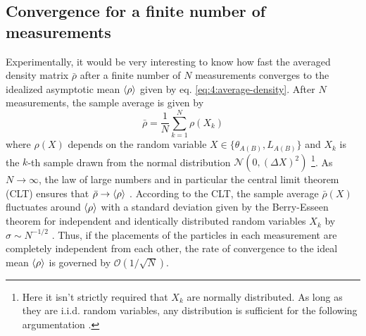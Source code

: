\subsection*{Convergence for a finite number of measurements}
Experimentally, it would be very interesting to know how fast the averaged density matrix $\bar{\rho}$ after a finite number of $N$ measurements converges to the idealized asymptotic mean $\left\langle\rho\right\rangle$ given by eq. \eqref{eq:4:average-density}.
After $N$ measurements, the sample average is given by
\begin{equation}
  \bar{\rho} = \frac{1}{N} \sum_{k=1}^{N} \rho(X_k)
\end{equation}
where $\rho(X)$ depends on the random variable $X \in \{\theta_{A(B)}, L_{A(B)}\}$ and $X_k$ is the $k$-th sample drawn from the normal distribution $\mathcal{N}(0, (\Delta X)^2)$ \footnote{Here it isn't strictly required that $X_k$ are normally distributed. As long as they are i.i.d. random variables, any distribution is sufficient for the following argumentation \cite[p. 1195]{Riley_2018}.}.
As $N \rightarrow \infty$, the law of large numbers and in particular the central limit theorem (CLT) ensures that $\bar{\rho} \rightarrow \left\langle\rho\right\rangle$ \cite[p. 1195]{Riley_2018}.
According to the CLT, the sample average $\bar{\rho}(X)$ fluctuates around $\left\langle\rho\right\rangle$ with a standard deviation given by the Berry-Esseen theorem for independent and identically distributed random variables $X_k$ by $\sigma \sim N^{-1/2}$ \cite{Berry_1941}.
Thus, if the placements of the particles in each measurement are completely independent from each other, the rate of convergence to the ideal mean $\left\langle\rho\right\rangle$ is governed by $\mathcal{O}(1/\sqrt{N})$.


